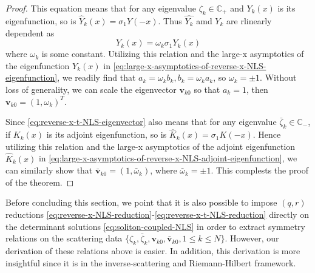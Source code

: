 \begin{proof}
    This equation means that for any eigenvalue $ \zeta_{k} \in \mathbb{C}_{+} $ and $ Y_{k}(x) $ is its eigenfunction, so is $ \hat{Y}_{k}(x) = \sigma_{1} Y(-x)$. Thus $ \hat{Y_{k}} $ amd $ Y_{k} $ are rlinearly dependent as 
    \begin{equation}
        Y_{k}(x) = \omega_{k}\sigma_{1}Y_{k}(x)
    \end{equation}
    where $ \omega_{k} $ is some constant. Utilizing this relation and the large-x asymptotics of the eigenfunction $ Y_{k}(x) $ in \eqref{eq:large-x-asymptotics-of-reverse-x-NLS-eigenfunction}, we readily find that $ a_{k} = \omega_{k} b_{k}, b_{k} = \omega_{k} a_{k} $, so $ \omega_{k} = \pm 1 $. Without loss of generality, we can scale the eigenvector $\mathbf{v}_{k0} $ so that $ a_{k} = 1$, then $ \mathbf{v}_{k0} = (1, \omega_{k})^{T} $.

    Since \eqref{eq:reverse-x-t-NLS-eigenvector} also means that for any eigenvalue $ \bar{\zeta}_{k} \in \mathbb{C}_{-} $, if $ K_{k}(x) $ is its adjoint eigenfunction, so is $ \hat{K}_{k}(x) = \sigma_{1} K(-x) $. Hence utilizing this relation and the large-x asymptotics of the adjoint eigenfunction $ \hat{K}_{k}(x) $ in \eqref{eq:large-x-asymptotics-of-reverse-x-NLS-adjoint-eigenfunction}, we can similarly show that $ \bar{\mathbf{v}}_{k0} = (1, \bar{\omega}_{k}) $, where $ \bar{\omega}_{k} = \pm 1 $. This complests the proof of the theorem.
\end{proof}

Before concluding this section, we point that it is also possible to impose $ (q,r) $ reductions \eqref{eq:reverse-x-NLS-reduction}-\eqref{eq:reverse-x-t-NLS-reduction} directly on the determinant solutions \eqref{eq:soliton-coupled-NLS} in order to extract symmetry relations on the scattering data $ \{\zeta_{k},\bar{\zeta}_{k},\mathbf{v}_{k0}, \bar{\mathbf{v}}_{k0}, 1 \leq k \leq N \} $. However, our derivation of these relations above is easier. In addition, this derivation is more insightful since it is in the inverse-scattering and Riemann-Hilbert framework.